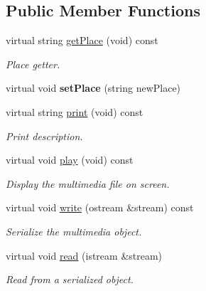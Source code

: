 \subsection*{Public Member Functions}
\begin{DoxyCompactItemize}
\item 
virtual string \hyperlink{class_photo_a62050b13fc758cbb446f6170bf3dbc65}{get\-Place} (void) const 
\begin{DoxyCompactList}\small\item\em Place getter. \end{DoxyCompactList}\item 
\hypertarget{class_photo_a50a5f650f944ecb86d88855aad0bc492}{virtual void {\bfseries set\-Place} (string new\-Place)}\label{class_photo_a50a5f650f944ecb86d88855aad0bc492}

\item 
virtual string \hyperlink{class_photo_af63cb6130ed71a7f44d789fb3a5c7f01}{print} (void) const 
\begin{DoxyCompactList}\small\item\em Print description. \end{DoxyCompactList}\item 
\hypertarget{class_photo_a061bcd0e2002613bac15ce2e23543b0b}{virtual void \hyperlink{class_photo_a061bcd0e2002613bac15ce2e23543b0b}{play} (void) const }\label{class_photo_a061bcd0e2002613bac15ce2e23543b0b}

\begin{DoxyCompactList}\small\item\em Display the multimedia file on screen. \end{DoxyCompactList}\item 
virtual void \hyperlink{class_photo_a65c10b1d3dd17be4d478f7c3fb04ddd4}{write} (ostream \&stream) const 
\begin{DoxyCompactList}\small\item\em Serialize the multimedia object. \end{DoxyCompactList}\item 
virtual void \hyperlink{class_photo_a0c0ede69ed7502df226a95bbb62d7b40}{read} (istream \&stream)
\begin{DoxyCompactList}\small\item\em Read from a serialized object. \end{DoxyCompactList}\end{DoxyCompactItemize}
